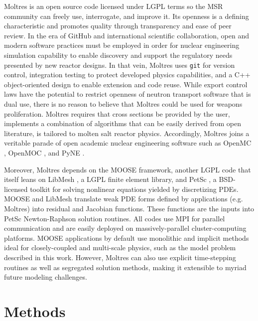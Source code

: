 \documentclass{article}
\let\Oldsection\section
\renewcommand{\section}{\FloatBarrier\Oldsection}
\begin{document}
Moltres is an open source code licensed under \gls{LGPL} terms so the 
\gls{MSR} community can freely use, interrogate, and improve it.  Its openness 
is a defining characteristic and promotes
quality through transparency and ease of peer review. In the era of
GitHub \cite{github_build_2017} and international scientific collaboration,
open and modern software practices must be employed in order for nuclear
engineering simulation capability to enable discovery and support the regulatory
needs presented by new reactor designs. In that vein, Moltres uses
\texttt{git} for version control, integration testing to protect
developed physics capabilities, and a C++ object-oriented design to
enable extension and code reuse. While export control laws have the potential 
to restrict openness of neutron transport software that is dual use, there is 
no reason to believe that Moltres could be used for weapons proliferation. 
Moltres requires that cross sections be provided by the user, implements a 
combination of algorithms that can be easily derived from open literature, is 
tailored to molten salt reactor physics. Accordingly, Moltres joins a veritable 
parade of open academic nuclear engineering software such as 
OpenMC \cite{romano_openmc:_2015}, OpenMOC \cite{boyd_openmoc_2014}, and 
PyNE \cite{bates_pyne_2014,biondo_quality_2014}. 

Moreover, Moltres depends on the \gls{MOOSE} 
framework, \cite{gaston_physics-based_2015} another \gls{LGPL} code that itself 
leans on LibMesh \cite{kirk_libmesh:_2006}, a
\gls{LGPL} finite element library, and PetSc \cite{satish_balay_petsc_2015}, a
\gls{BSD}-licensed toolkit for solving nonlinear equations yielded by 
discretizing PDEs. \gls{MOOSE} and LibMesh translate weak PDE forms defined by
applications (e.g. Moltres) into residual and Jacobian
functions. These functions are the inputs into PetSc Newton-Raphson solution routines. All
codes use MPI for parallel communication and are easily deployed on
massively-parallel cluster-computing platforms. \gls{MOOSE} applications by
default use monolithic and implicit methods ideal for closely-coupled
and multi-scale physics, such as the model problem described
in this work. However, Moltres can also use explicit
time-stepping routines as well as segregated solution methods, making it 
extensible to myriad future modeling challenges.

\section{Methods}
\end{document}
